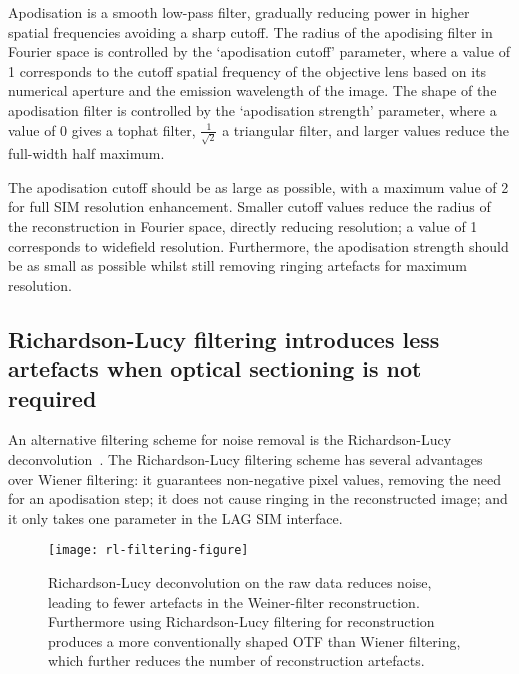 Apodisation is a smooth low-pass filter, gradually reducing power in higher spatial frequencies avoiding a sharp cutoff. 
The radius of the apodising filter in Fourier space is controlled by the `apodisation cutoff' parameter, where a value of 1 corresponds to the cutoff spatial frequency of the objective lens based on its numerical aperture and the emission wavelength of the image. 
The shape of the apodisation filter is controlled by the `apodisation strength' parameter, where a value of 0 gives a tophat filter, $\frac{1}{\sqrt{2}}$ a triangular filter, and larger values reduce the full-width half maximum. %

The apodisation cutoff should be as large as possible, with a maximum value of 2 for full SIM resolution enhancement. 
Smaller cutoff values reduce the radius of the reconstruction in Fourier space, directly reducing resolution; a value of 1 corresponds to widefield resolution. 
Furthermore, the apodisation strength should be as small as possible whilst still removing ringing artefacts for maximum resolution. 

\subsection{Richardson-Lucy filtering introduces less artefacts when optical sectioning is not required}
An alternative filtering scheme for noise removal is the Richardson-Lucy deconvolution~\cite{perez2016optimal}. 
The Richardson-Lucy filtering scheme has several advantages over Wiener filtering: it guarantees non-negative pixel values, removing the need for an apodisation step; it does not cause ringing in the reconstructed image; and it only takes one parameter in the LAG SIM interface.


\begin{figure}[p]
\centering
\texttt{[image: rl-filtering-figure]}
\caption[LAG SIM: Richardson-Lucy filtering can further reduce SIM reconstruction artefacts]{Richardson-Lucy deconvolution on the raw data reduces noise, leading to fewer artefacts in the Weiner-filter reconstruction. Furthermore using Richardson-Lucy filtering for reconstruction produces a more conventionally shaped OTF than Wiener filtering, which further reduces the number of reconstruction artefacts.}
\label{fig:rl-filtering}
\end{figure}

